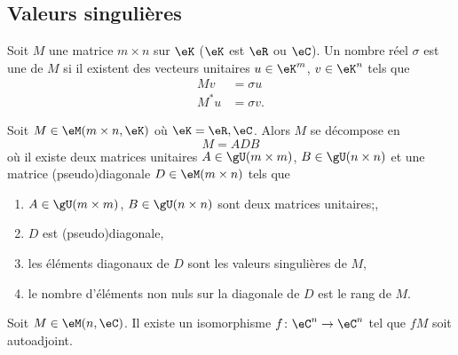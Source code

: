 \subsection{Valeurs singulières}

\begin{definition}
    Soit \( M\) une matrice \( m\times n\) sur \( \eK\) (\( \eK\) est \( \eR\) ou \( \eC\)). Un nombre réel \( \sigma\) est une  de \( M\) si il existent des vecteurs unitaires \( u\in \eK^m\), \( v\in \eK^n\) tels que
    \begin{subequations}
        \begin{align}
            Mv&=\sigma u\\
            M^*u&=\sigma v.
        \end{align}
    \end{subequations}
\end{definition}

\begin{theorem}
    Soit \( M\in \eM(m\times n,\eK)\) où \( \eK=\eR,\eC\). Alors \( M\) se décompose en
    \begin{equation}
        M=ADB
    \end{equation}
    où
    il existe deux matrices unitaires \( A\in \gU(m\times m)\), \( B\in \gU(n\times n)\) et une matrice (pseudo)diagonale \( D\in \eM(m\times n)\) tels que
    \begin{enumerate}
        \item 
            \( A\in\gU(m\times m)\), \( B\in\gU(n\times n)\) sont deux matrices unitaires;,
        \item
            \( D\) est (pseudo)diagonale,
        \item
            les éléments diagonaux de \( D\) sont les valeurs singulières de \( M\),
        \item
            le nombre d'éléments non nuls sur la diagonale de \( D\) est le rang de \( M\).
    \end{enumerate}
\end{theorem}

\begin{corollary}
    Soit \( M\in \eM(n,\eC)\). Il existe un isomorphisme \( f\colon \eC^n\to \eC^n\) tel que \( fM\) soit autoadjoint.
\end{corollary}

